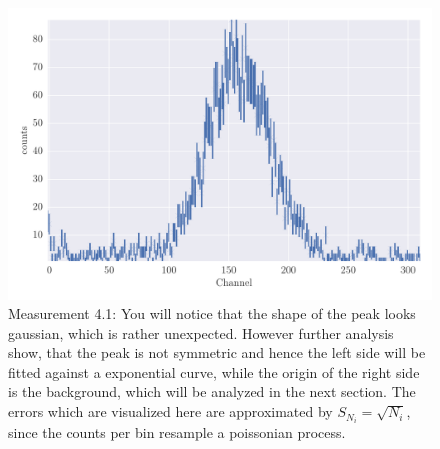 \begin{figure}[htpb]
    \centering
    \includegraphics[width=1.0\linewidth]{analysis/figures/plot4_1}
    \caption{Measurement 4.1: You will notice that the shape
        of the peak looks gaussian, which is rather unexpected. However
        further analysis show, that the peak is not symmetric and hence the left 
        side will be fitted against a exponential curve, while the origin of the
        right side is the background, which will be analyzed in the next section.
        The errors which are visualized here are approximated by $S_{N_i} = \sqrt{N_i}$, since
        the counts per bin resample a poissonian process.}
    \label{fig:4_1}
\end{figure}
\clearpage
